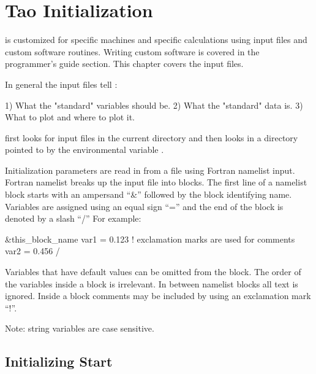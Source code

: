\chapter{Tao Initialization}
\label{c:init}

\tao is customized for specific machines and specific calculations
using input files and custom software routines. Writing custom software is
covered in the programmer's guide section. This chapter covers the
input files. 

In general the input files tell \tao:
\begin{example}
  1) What the "standard" variables should be.
  2) What the "standard" data is.
  3) What to plot and where to plot it.
\end{example}

\tao first looks for input files in the current directory and then
looks in a directory pointed to by the environmental variable
.

Initialization parameters are read in from a file using Fortran
namelist input. Fortran namelist breaks up the input file into
blocks. The first line of a namelist block starts with an ampersand ``\&''
followed by the block identifying name. Variables are assigned using
an equal sign ``='' and the end of the block is denoted by a slash ``/''
For example:
\begin{example}
  \&this_block_name
    var1 = 0.123   ! exclamation marks are used for comments
    var2 = 0.456
  /
\end{example}
Variables that have default values can be omitted from the block.  The
order of the variables inside a block is irrelevant.  In between
namelist blocks all text is ignored. Inside a block comments may be
included by using an exclamation mark ``!''.

Note: string variables are case sensitive.

\section{Initializing Start}
\label{s:init_global} 

